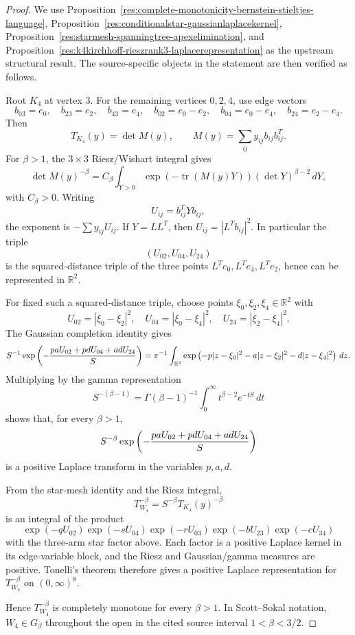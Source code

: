 \documentclass[11pt]{article}
\numberwithin{equation}{section}
\theoremstyle{definition}
\theoremstyle{remark}
\newcommand{\1}{\mathbf 1}
\begin{document}
\begin{proof}
We use Proposition~\ref{res:complete-monotonicity-bernstein-stieltjes-language}, Proposition~\ref{res:conditionalstar-gaussianlaplacekernel}, Proposition~\ref{res:starmesh-spanningtree-apexelimination}, and Proposition~\ref{res:k4kirchhoff-rieszrank3-laplacerepresentation} as the upstream structural result. The source-specific objects in the statement are then verified as follows.

Root \(K_4\) at vertex \(3\). For the remaining vertices \(0,2,4\), use edge vectors
\[
b_{03}=e_0,\quad b_{23}=e_2,\quad b_{43}=e_4,\quad
b_{02}=e_0-e_2,\quad b_{04}=e_0-e_4,\quad b_{24}=e_2-e_4 .
\]
Then
\[
T_{K_4}(y)=\det M(y),\qquad
M(y)=\sum_{ij} y_{ij} b_{ij}b_{ij}^{T}.
\]
For \(\beta>1\), the \(3\times3\) Riesz/Wishart integral gives
\[
\det M(y)^{-\beta}
=C_\beta\int_{Y>0}
\exp\!\left(-\operatorname{tr}(M(y)Y)\right)
(\det Y)^{\beta-2}\,dY,
\]
with \(C_\beta>0\). Writing
\[
U_{ij}=b_{ij}^{T}Yb_{ij},
\]
the exponent is \(-\sum y_{ij}U_{ij}\). If \(Y=LL^T\), then \(U_{ij}=|L^Tb_{ij}|^2\). In particular the triple
\[
(U_{02},U_{04},U_{24})
\]
is the squared-distance triple of the three points \(L^Te_0,L^Te_4,L^Te_2\), hence can be represented in \(\mathbb R^2\).

For fixed such a squared-distance triple, choose points
\(\xi_0,\xi_2,\xi_4\in\mathbb R^2\) with
\[
U_{02}=|\xi_0-\xi_2|^2,\quad
U_{04}=|\xi_0-\xi_4|^2,\quad
U_{24}=|\xi_2-\xi_4|^2.
\]
The Gaussian completion identity gives
\[
S^{-1}\exp\left(
-{paU_{02}+pdU_{04}+adU_{24}\over S}
\right)
=\pi^{-1}\int_{\mathbb R^2}
\exp\left(-p|z-\xi_0|^2-a|z-\xi_2|^2-d|z-\xi_4|^2\right)\,dz .
\]
Multiplying by the gamma representation
\[
S^{-(\beta-1)}
=\Gamma(\beta-1)^{-1}\int_0^\infty t^{\beta-2}e^{-tS}\,dt
\]
shows that, for every \(\beta>1\),
\[
S^{-\beta}
\exp\left(
-{paU_{02}+pdU_{04}+adU_{24}\over S}
\right)
\]
is a positive Laplace transform in the variables \(p,a,d\).

From the star-mesh identity and the Riesz integral,
\[
T_{W_4}^{-\beta}
=S^{-\beta}T_{K_4}(y)^{-\beta}
\]
is an integral of the product
\[
\exp(-qU_{02})\exp(-sU_{04})\exp(-rU_{03})
\exp(-bU_{23})\exp(-cU_{34})
\]
with the three-arm star factor above. Each factor is a positive Laplace kernel in its edge-variable block, and the Riesz and Gaussian/gamma measures are positive. Tonelli's theorem therefore gives a positive Laplace representation for \(T_{W_4}^{-\beta}\) on \((0,\infty)^8\).

Hence \(T_{W_4}^{-\beta}\) is completely monotone for every \(\beta>1\). In Scott--Sokal notation, \(W_4\in G_\beta\) throughout the open in the cited source interval \(1<\beta<3/2\).
\end{proof}
\end{document}
